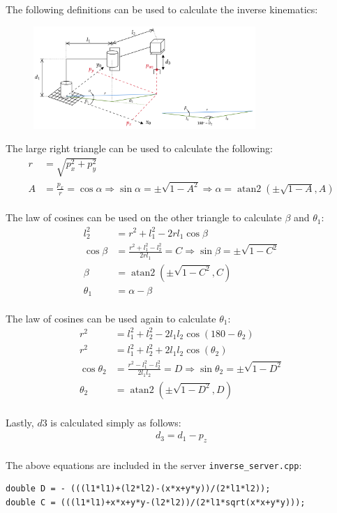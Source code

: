 \documentclass[10pt]{article}
\DeclareMathOperator{\atantwo}{atan2}
\begin{document}
\begin{enumerate}
	The following definitions can be used to calculate the inverse kinematics:
	\begin{figure}[H]
		\centering
		\includegraphics[width=0.75\textwidth]{figures/rrp_IK.png}
	\end{figure}
	
	The large right triangle can be used to calculate the following:
	\begin{align*}
		r &= \sqrt{p_x^2 + p_y^2} \\
		A &= \frac{p_x}{r} = \cos\alpha \Rightarrow
		\sin \alpha = \pm \sqrt{1 - A^2} \Rightarrow \alpha = \atantwo\left(\pm \sqrt{1-A}, A\right)
	\end{align*}
	\\
	The law of cosines can be used on the other triangle to calculate $\beta$ and $\theta_1$:
	\begin{align*}
		l_2^2 &= r^2 + l_1^2 - 2 r l_1 \cos\beta \\
		\cos\beta & = \frac{r^2 + l_1^2 - l_2^2}{2 r l_1} = C \Rightarrow \sin\beta = \pm\sqrt{1-C^2} \\
		\beta &= \atantwo\left(\pm\sqrt{1-C^2}, C\right) \\
		\theta_1 &= \alpha - \beta
	\end{align*}
	\\
	The law of cosines can be used again to calculate $\theta_1$:
	\begin{align*}
		r^2 &= l_1^2 + l_2^2 - 2 l_1 l_2 \cos(180-\theta_2) \\
		r^2 &= l_1^2 + l_2^2 + 2 l_1 l_2 \cos(\theta_2) \\
		\cos\theta_2 & = \frac{r^2 - l_1^2 - l_2^2}{2 l_1 l_2} = D \Rightarrow \sin\theta_2 = \pm\sqrt{1-D^2} \\
		\theta_2 &= \atantwo\left(\pm\sqrt{1-D^2}, D\right)
	\end{align*}
	\\
	Lastly, $d3$ is calculated simply as follows:
	\begin{align*}
		d_3 = d_1 - p_z
	\end{align*}
	\\
	The above equations are included in the server \texttt{inverse\_server.cpp}:
\begin{lstlisting}[style=Matlab-editor,basicstyle=\mlttfamily,escapechar=`]
double D = - (((l1*l1)+(l2*l2)-(x*x+y*y))/(2*l1*l2));
double C = (((l1*l1)+x*x+y*y-(l2*l2))/(2*l1*sqrt(x*x+y*y)));


\end{lstlisting}
\end{enumerate}
\end{document}
